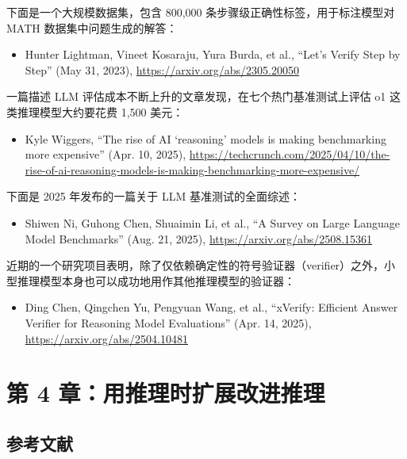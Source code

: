 下面是一个大规模数据集，包含 800,000 条步骤级正确性标签，用于标注模型对 MATH 数据集中问题生成的解答：

\begin{itemize}
\item Hunter Lightman, Vineet Kosaraju, Yura Burda, et al., “Let's Verify Step by Step” (May 31, 2023), \href{https://arxiv.org/abs/2305.20050}{https://arxiv.org/abs/2305.20050}
\end{itemize}

一篇描述 LLM 评估成本不断上升的文章发现，在七个热门基准测试上评估 o1 这类推理模型大约要花费 1,500 美元：

\begin{itemize}
\item Kyle Wiggers, “The rise of AI ‘reasoning’ models is making benchmarking more expensive” (Apr. 10, 2025), \href{https://techcrunch.com/2025/04/10/the-rise-of-ai-reasoning-models-is-making-benchmarking-more-expensive/}{https://techcrunch.com/2025/04/10/the-rise-of-ai-reasoning-models-is-making-benchmarking-more-expensive/}
\end{itemize}

下面是 2025 年发布的一篇关于 LLM 基准测试的全面综述：

\begin{itemize}
\item Shiwen Ni, Guhong Chen, Shuaimin Li, et al., “A Survey on Large Language Model Benchmarks” (Aug. 21, 2025), \href{https://arxiv.org/abs/2508.15361}{https://arxiv.org/abs/2508.15361}
\end{itemize}

近期的一个研究项目表明，除了仅依赖确定性的符号验证器（verifier）之外，小型推理模型本身也可以成功地用作其他推理模型的验证器：

\begin{itemize}
\item Ding Chen, Qingchen Yu, Pengyuan Wang, et al., “xVerify: Efficient Answer Verifier for Reasoning Model Evaluations” (Apr. 14, 2025), \href{https://arxiv.org/abs/2504.10481}{https://arxiv.org/abs/2504.10481}
\end{itemize}

\section{第 4 章：用推理时扩展改进推理}

\subsection{参考文献}

